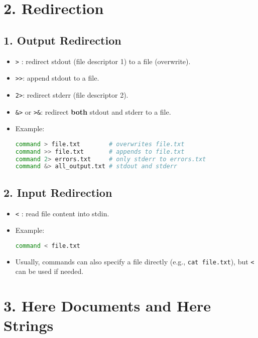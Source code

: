 \documentclass[a4paper]{report}
\begin{document}
\section*{2. Redirection}
\subsection*{1. Output Redirection}
\begin{itemize}
    \item \texttt{>} : redirect stdout (file descriptor 1) to a file (overwrite).  
    \item \texttt{>>}: append stdout to a file.  
    \item \texttt{2>}: redirect stderr (file descriptor 2).  
    \item \texttt{\&>} or \texttt{>\&}: redirect \textbf{both} stdout and stderr to a file.  
    \item Example:
    \begin{lstlisting}[language=bash]
command > file.txt        # overwrites file.txt
command >> file.txt       # appends to file.txt
command 2> errors.txt     # only stderr to errors.txt
command &> all_output.txt # stdout and stderr
    \end{lstlisting}
\end{itemize}



\subsection*{2. Input Redirection}
\begin{itemize}
    \item \texttt{<} : read file content into stdin.  
    \item Example:
    \begin{lstlisting}[language=bash]
command < file.txt
    \end{lstlisting}
    \item Usually, commands can also specify a file directly (e.g., \texttt{cat file.txt}), but \texttt{<} can be used if needed.
\end{itemize}


\section*{3. Here Documents and Here Strings}
\end{document}
